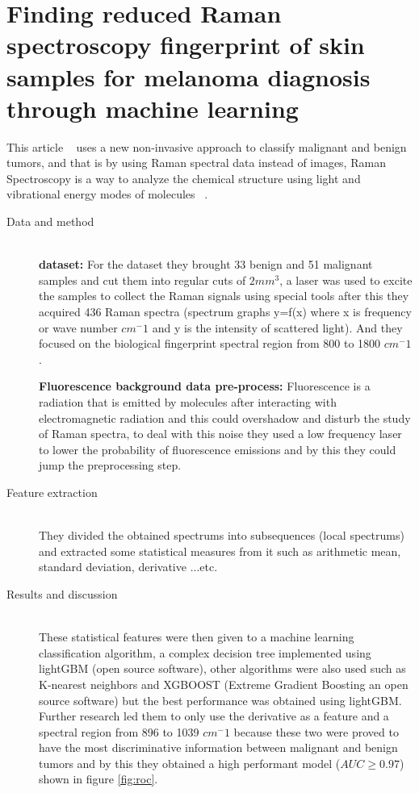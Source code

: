 
\section{Finding reduced Raman spectroscopy fingerprint of skin samples for melanoma diagnosis through machine learning}
    This article ~\cite{Daniella2021} uses a new non-invasive approach to classify malignant and benign tumors, and that is by using Raman spectral data instead of images, Raman Spectroscopy is a way to analyze the chemical structure using light and vibrational energy modes of molecules ~\cite{Edinburgh}.
\begin{description}
\item[Data and method] \hfill \\
    
    \textbf{dataset: }
    For the dataset they brought 33 benign and 51 malignant samples and cut them into regular cuts of $2mm^3$, a laser was used to excite the samples to collect the Raman signals using special tools after this they acquired 436 Raman spectra (spectrum graphs y=f(x) where x is frequency or wave number $cm^-1$ and y is the intensity of scattered light). And they focused on the biological fingerprint spectral region from 800 to 1800 $cm^-1$.

    \textbf{Fluorescence background data pre-process: }
    Fluorescence is a radiation that is emitted by molecules after interacting with electromagnetic radiation and this could overshadow and disturb the study of Raman spectra, to deal with this noise they used a low frequency laser to lower the probability of fluorescence emissions and by this they could jump the preprocessing step.
\item[Feature extraction] \hfill \\
    They divided the obtained spectrums into subsequences (local spectrums) and extracted some statistical measures from it such as arithmetic mean, standard deviation, derivative ...etc.

\item[Results and discussion] \hfill \\
    These statistical features were then given to a machine learning classification algorithm, a complex decision tree implemented using lightGBM (open source software), other algorithms were also used such as K-nearest neighbors and XGBOOST (Extreme Gradient Boosting an open source software) but the best performance was obtained using lightGBM.
    Further research led them to only use the derivative as a feature and a spectral region from 896 to 1039 $cm^-1$ because these two were proved to have the most discriminative information between malignant and benign tumors and by this they obtained a high performant model ($AUC \geq 0.97$) shown in figure \ref{fig:roc}.
\end{description}

